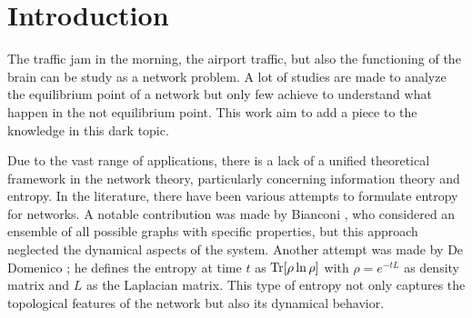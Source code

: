 \chapter*{Introduction}

The traffic jam in the morning, the airport traffic, but also the functioning of the brain can be study as a network problem. 
A lot of studies are made to analyze the equilibrium point of a network but only few achieve to understand what happen in the not equilibrium point. This work aim to add a piece to the knowledge in this dark topic.




Due to the vast range of applications, there is a lack of a unified theoretical framework in the network theory, particularly concerning information theory and entropy. 
In the literature, there have been various attempts to formulate entropy for networks. A notable contribution was made by Bianconi \cite{Bianconi_entropy_1}\cite{Bianconi_entropy_2}, who considered an ensemble of all possible graphs with specific properties, but this approach neglected the dynamical aspects of the system.
Another attempt was made by De Domenico \cite{De_Domenico_2016}; he defines the entropy at time $t$ as $\operatorname{Tr}[\rho \ln \rho]$ with $\rho = e^{-tL}$ as density matrix and $L$ as the Laplacian matrix. This type of entropy not only captures the topological features of the network but also its dynamical behavior.


